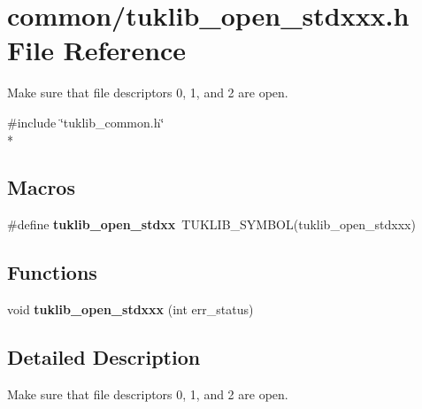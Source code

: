 \section{common/tuklib\-\_\-open\-\_\-stdxxx.h File Reference}
\label{tuklib__open__stdxxx_8h}


Make sure that file descriptors 0, 1, and 2 are open.  


{\ttfamily \#include \char`\"{}tuklib\-\_\-common.\-h\char`\"{}}\\*
\subsection*{Macros}
\begin{DoxyCompactItemize}
\item 
\#define {\bfseries tuklib\-\_\-open\-\_\-stdxx}~T\-U\-K\-L\-I\-B\-\_\-\-S\-Y\-M\-B\-O\-L(tuklib\-\_\-open\-\_\-stdxxx)\label{tuklib__open__stdxxx_8h_ad0b7dc12c4708d4cc0bca43f9be0beb7}

\end{DoxyCompactItemize}
\subsection*{Functions}
\begin{DoxyCompactItemize}
\item 
void {\bfseries tuklib\-\_\-open\-\_\-stdxxx} (int err\-\_\-status)\label{tuklib__open__stdxxx_8h_a8baa8536f3713be6b84596acc12b5b39}

\end{DoxyCompactItemize}


\subsection{Detailed Description}
Make sure that file descriptors 0, 1, and 2 are open. 